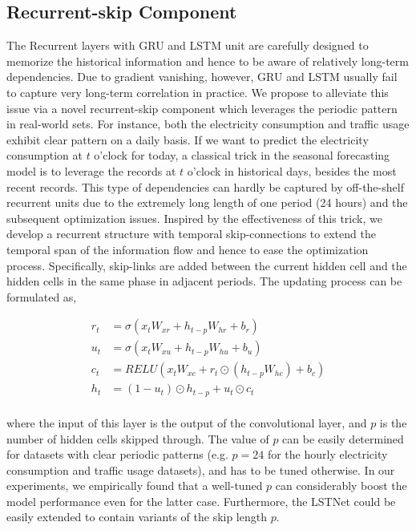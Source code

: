 \subsection{Recurrent-skip Component}
\label{subsec:recurrent-skip}

The Recurrent layers with GRU \cite{chung2014empirical} and LSTM \cite{hochreiter1997long} unit are carefully designed to memorize the historical information and hence to be aware of relatively long-term dependencies. Due to gradient vanishing, however, GRU and LSTM usually fail to capture very long-term correlation in practice. We propose to alleviate this issue via a novel recurrent-skip component which leverages the periodic pattern in real-world sets. For instance, both the electricity consumption and traffic usage exhibit clear pattern on a daily basis. If we want to predict the electricity consumption at $t$ o'clock for today, a classical trick in the seasonal forecasting model is to leverage the records at $t$ o'clock in historical days, besides the most recent records.
This type of dependencies can hardly be captured by off-the-shelf recurrent units due to the extremely long length of one period (24 hours) and the subsequent optimization issues. Inspired by the effectiveness of this trick, we develop a recurrent structure with temporal skip-connections to extend the temporal span of the information flow and hence to ease the optimization process. Specifically, skip-links are added between the current hidden cell and the hidden cells in the same phase in adjacent periods. The updating process can be formulated as,

\begin{equation}
\begin{aligned}
r_t &= \sigma(x_tW_{xr} + h_{t-p}W_{hr} + b_r) \\
u_t &= \sigma(x_tW_{xu} + h_{t-p}W_{hu} + b_u) \\
c_t &= RELU(x_tW_{xc} + r_{t}\odot(h_{t-p}W_{hc}) + b_c) \\
h_t &= (1-u_t) \odot h_{t-p} + u_t \odot c_t \\
\end{aligned}
\label{eq:rnn-skip}
\end{equation}

where the input of this layer is the output of the convolutional layer, and $p$ is the number of hidden cells skipped through. The value of $p$ can be easily determined for datasets with clear periodic patterns (e.g. $p=24$ for the hourly electricity consumption and traffic usage datasets), and has to be tuned otherwise. In our experiments, we empirically found that a well-tuned $p$ can considerably boost the model performance even for the latter case. Furthermore, the LSTNet could be easily extended to contain variants of the skip length $p$.

